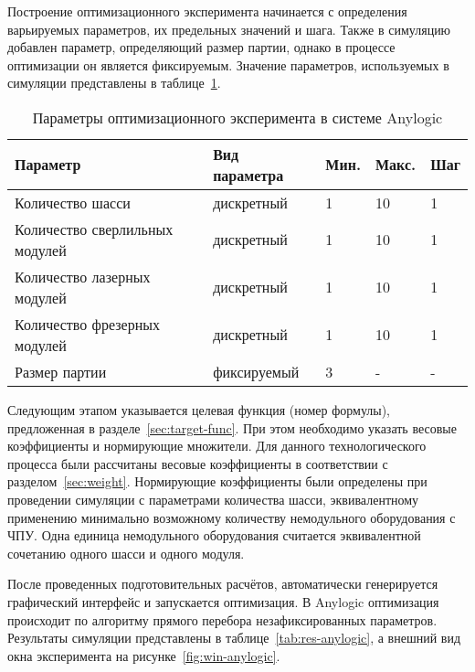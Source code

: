Построение оптимизационного эксперимента начинается с определения варьируемых параметров, их предельных значений и шага.  Также в симуляцию добавлен параметр, определяющий размер партии, однако в процессе оптимизации он является фиксируемым. Значение параметров, используемых в симуляции представлены в таблице~\cref{tab:par-anylogic}.

\begin{table} [!htb]
	\centering
	\caption{Параметры оптимизационного эксперимента в системе Anylogic} \vspace{4pt}
	\label{tab:par-anylogic}
	\begin{threeparttable}
		\begin{tabularx}{\linewidth}{lllll}
			\toprule
			Параметр & Вид параметра & Мин. & Макс. & Шаг \\
			\midrule
			Количество шасси               & дискретный  & 1 & 10 & 1 \\
			Количество сверлильных модулей & дискретный  & 1 & 10 & 1 \\
			Количество лазерных модулей    & дискретный  & 1 & 10 & 1 \\
			Количество фрезерных модулей   & дискретный  & 1 & 10 & 1 \\
			Размер партии                  & фиксируемый & 3 &  - & - \\
			\bottomrule
		\end{tabularx}
	\end{threeparttable}
\end{table}

Следующим этапом указывается целевая функция (номер формулы), предложенная в разделе~\cref{sec:target-func}. При этом необходимо указать весовые коэффициенты и нормирующие множители. Для данного технологического процесса были рассчитаны весовые коэффициенты в соответствии с разделом~\cref{sec:weight}. 
Нормирующие коэффициенты были определены при проведении симуляции с параметрами количества шасси, эквивалентному применению минимально возможному количеству немодульного оборудования с ЧПУ. Одна единица немодульного оборудования считается эквивалентной сочетанию одного шасси и одного модуля.

После проведенных подготовительных расчётов, автоматически генерируется графический интерфейс и запускается оптимизация. В Anylogic оптимизация происходит по алгоритму прямого перебора незафиксированных параметров. Результаты симуляции представлены в таблице~\cref{tab:res-anylogic}, а внешний вид окна эксперимента на рисунке~\cref{fig:win-anylogic}.


